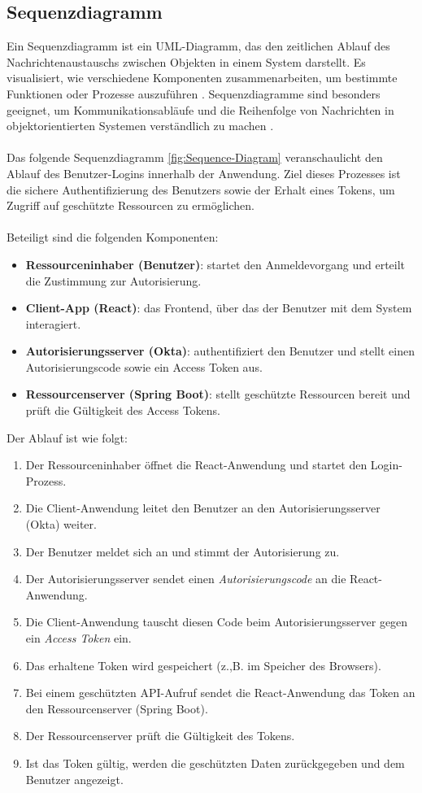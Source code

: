 \subsection{Sequenzdiagramm}

Ein Sequenzdiagramm ist ein UML-Diagramm, das den zeitlichen Ablauf des Nachrichtenaustauschs zwischen Objekten in einem System darstellt. Es visualisiert, wie verschiedene Komponenten zusammenarbeiten, um bestimmte Funktionen oder Prozesse auszuführen \cite{Sequenzdiagramm:2021}.
Sequenzdiagramme sind besonders geeignet, um Kommunikationsabläufe und die Reihenfolge von Nachrichten in objektorientierten Systemen verständlich zu machen \cite[S.28]{swain2010test}.\\  \\ 
Das folgende Sequenzdiagramm  \ref{fig:Sequence-Diagram} veranschaulicht den Ablauf des Benutzer-Logins innerhalb der Anwendung. Ziel dieses Prozesses ist die sichere Authentifizierung des Benutzers sowie der Erhalt eines Tokens, um Zugriff auf geschützte Ressourcen zu ermöglichen. \\  \\
Beteiligt sind die folgenden Komponenten:
\begin{itemize}
	\item \textbf{Ressourceninhaber (Benutzer)}: startet den Anmeldevorgang und erteilt die Zustimmung zur Autorisierung.
	\item \textbf{Client-App (React)}: das Frontend, über das der Benutzer mit dem System interagiert.
	\item \textbf{Autorisierungsserver (Okta)}: authentifiziert den Benutzer und stellt einen Autorisierungscode sowie ein Access Token aus.
	\item \textbf{Ressourcenserver (Spring Boot)}: stellt geschützte Ressourcen bereit und prüft die Gültigkeit des Access Tokens.
\end{itemize}  
Der Ablauf ist wie folgt:

\begin{enumerate}
	\item Der Ressourceninhaber öffnet die React-Anwendung und startet den Login-Prozess.
	\item Die Client-Anwendung leitet den Benutzer an den Autorisierungsserver (Okta) weiter.
	\item Der Benutzer meldet sich an und stimmt der Autorisierung zu.
	\item Der Autorisierungsserver sendet einen \textit{Autorisierungscode} an die React-Anwendung.
	\item Die Client-Anwendung tauscht diesen Code beim Autorisierungsserver gegen ein \textit{Access Token} ein.
	\item Das erhaltene Token wird gespeichert (z.,B. im Speicher des Browsers).
	\item Bei einem geschützten API-Aufruf sendet die React-Anwendung das Token an den Ressourcenserver (Spring Boot).
	\item Der Ressourcenserver prüft die Gültigkeit des Tokens.
	\item Ist das Token gültig, werden die geschützten Daten zurückgegeben und dem Benutzer angezeigt.
\end{enumerate}


